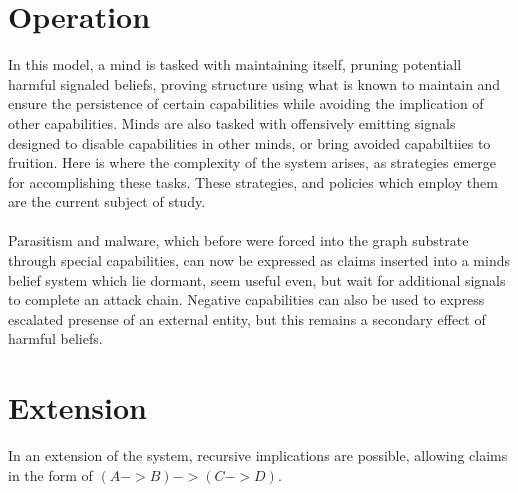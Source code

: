 \documentclass{article}
\begin{document}
	\section{Operation}
	In this model, a mind is tasked with maintaining itself, pruning potentiall harmful signaled beliefs, proving structure using what is known to maintain and ensure the persistence of certain capabilities while avoiding the implication of other capabilities. Minds are also tasked with offensively emitting signals designed to disable capabilities in other minds, or bring avoided capabiltiies to fruition. Here is where the complexity of the system arises, as strategies emerge for accomplishing these tasks. These strategies, and policies which employ them are the current subject of study.\\\\
	Parasitism and malware, which before were forced into the graph substrate through special capabilities, can now be expressed as claims inserted into a minds belief system which lie dormant, seem useful even, but wait for additional signals to complete an attack chain. Negative capabilities can also be used to express escalated presense of an external entity, but this remains a secondary effect of harmful beliefs. 
	\section{Extension}
	In an extension of the system, recursive implications are possible, allowing claims in the form of $(A -> B) -> (C -> D)$.
\end{document}
